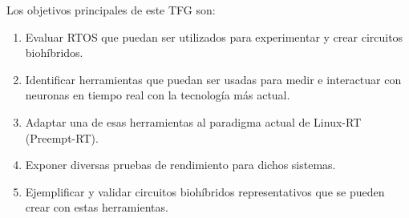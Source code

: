 
Los objetivos principales de este TFG son:

\begin{enumerate}
    \item Evaluar RTOS que puedan ser utilizados para experimentar y crear circuitos biohíbridos.
    \item Identificar herramientas que puedan ser usadas para medir e interactuar con neuronas en tiempo real con la tecnología más actual.
    \item Adaptar una de esas herramientas al paradigma actual de Linux-RT (Preempt-RT).
    \item Exponer diversas pruebas de rendimiento para dichos sistemas.
    \item Ejemplificar y validar circuitos biohíbridos representativos que se pueden crear con estas herramientas.
\end{enumerate}
